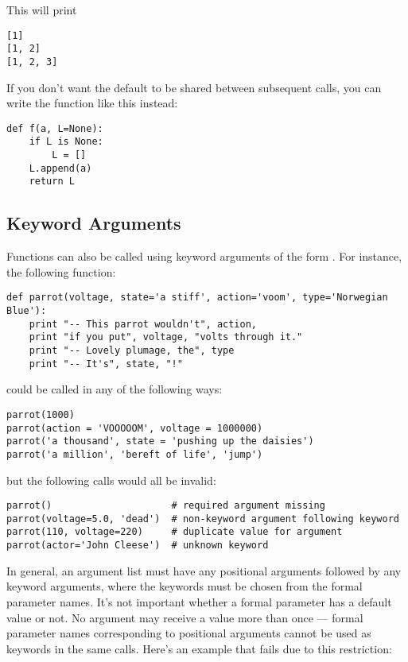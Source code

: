 \documentclass{manual}
\begin{document}
This will print

\begin{verbatim}
[1]
[1, 2]
[1, 2, 3]
\end{verbatim}

If you don't want the default to be shared between subsequent calls,
you can write the function like this instead:

\begin{verbatim}
def f(a, L=None):
    if L is None:
        L = []
    L.append(a)
    return L
\end{verbatim}

\subsection{Keyword Arguments \label{keywordArgs}}

Functions can also be called using
keyword arguments of the form .  For
instance, the following function:

\begin{verbatim}
def parrot(voltage, state='a stiff', action='voom', type='Norwegian Blue'):
    print "-- This parrot wouldn't", action,
    print "if you put", voltage, "volts through it."
    print "-- Lovely plumage, the", type
    print "-- It's", state, "!"
\end{verbatim}

could be called in any of the following ways:

\begin{verbatim}
parrot(1000)
parrot(action = 'VOOOOOM', voltage = 1000000)
parrot('a thousand', state = 'pushing up the daisies')
parrot('a million', 'bereft of life', 'jump')
\end{verbatim}

but the following calls would all be invalid:

\begin{verbatim}
parrot()                     # required argument missing
parrot(voltage=5.0, 'dead')  # non-keyword argument following keyword
parrot(110, voltage=220)     # duplicate value for argument
parrot(actor='John Cleese')  # unknown keyword
\end{verbatim}

In general, an argument list must have any positional arguments
followed by any keyword arguments, where the keywords must be chosen
from the formal parameter names.  It's not important whether a formal
parameter has a default value or not.  No argument may receive a
value more than once --- formal parameter names corresponding to
positional arguments cannot be used as keywords in the same calls.
Here's an example that fails due to this restriction:
\end{document}
